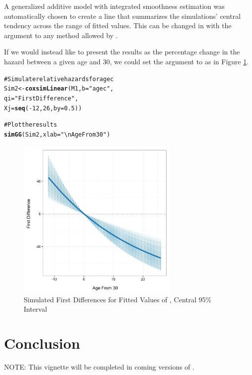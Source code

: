 \documentclass[nojss]{jss}\usepackage{graphicx, color}
\makeatletter
\newcommand{\hlfunctioncall}[1]{\textcolor[rgb]{0.501960784313725,0,0.329411764705882}{\textbf{#1}}}%
\newcommand{\hlstring}[1]{\textcolor[rgb]{0.6,0.6,1}{#1}}%
\newcommand{\hlcomment}[1]{\textcolor[rgb]{0.180392156862745,0.6,0.341176470588235}{#1}}%
\newenvironment{kframe}{%
 \def\at@end@of@kframe{}%
 \ifinner\ifhmode%
  \def\at@end@of@kframe{\end{minipage}}%
  \begin{minipage}{\columnwidth}%
 \fi\fi%
 \def\FrameCommand##1{\hskip\@totalleftmargin \hskip-\fboxsep
 \colorbox{shadecolor}{##1}\hskip-\fboxsep
     \hskip-\linewidth \hskip-\@totalleftmargin \hskip\columnwidth}%
 \MakeFramed {\advance\hsize-\width
   \@totalleftmargin\z@ \linewidth\hsize
   \@setminipage}}%
 {\par\unskip\endMakeFramed%
 \at@end@of@kframe}
\newenvironment{knitrout}{}{} %
\makeatother
\begin{document}
A generalized additive model with integrated smoothness estimation \citep[see][]{R-mgcv} was automatically chosen to create a line that summarizes the simulations' central tendency across the range of fitted values. This can be changed in  with the  argument to any method allowed by . 

If we would instead like to present the results as the percentage change in the hazard between a given age and 30, we could set the   argument to  as in Figure \ref{Linear2}.

\begin{knitrout}
\color{fgcolor}\begin{kframe}
\begin{alltt}
\hlcomment{# Simulate relative hazards for agec}
Sim2 <- \hlfunctioncall{coxsimLinear}(M1, b = \hlstring{"agec"}, 
					 qi = \hlstring{"First Difference"},
                     Xj = \hlfunctioncall{seq}(-12, 26, by = 0.5))

\hlcomment{# Plot the results}
\hlfunctioncall{simGG}(Sim2, xlab = \hlstring{"\textbackslash{}n Age From 30"})
\end{alltt}
\end{kframe}
\end{knitrout}


\begin{figure}
	\caption{Simulated First Differences for Fitted Values of , Central 95\% Interval}
	\label{Linear2}
	\vspace{0.3cm}
\begin{knitrout}
\color{fgcolor}

{\centering \includegraphics[width=0.7\textwidth,height=0.35\textheight]{figure/Linear5_1} 

}



\end{knitrout}

\end{figure}
\section{Conclusion}

NOTE: This vignette will be completed in coming versions of .


\end{document}
